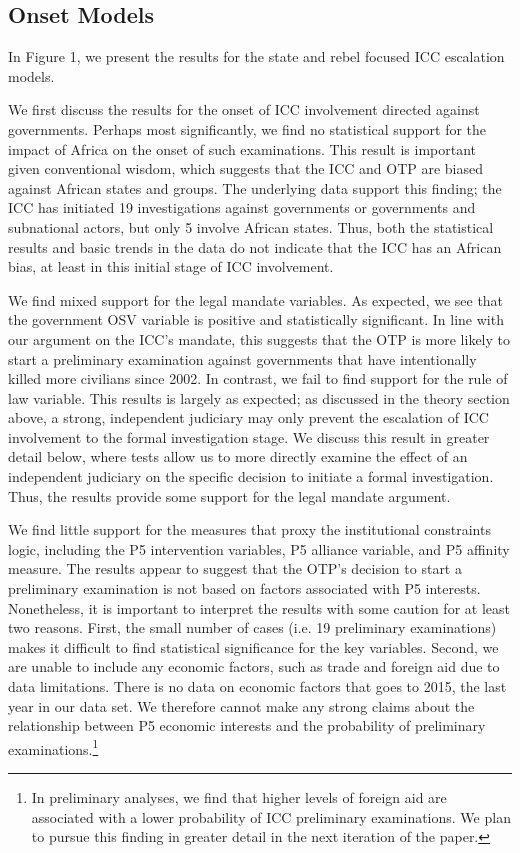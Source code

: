 
\subsection*{Onset Models}

In Figure 1, we present the results for the state and rebel focused ICC escalation models.  

We first discuss the results for the onset of ICC involvement directed against governments.  Perhaps most significantly, we find no statistical support for the impact of Africa on the onset of such examinations. This result is important given conventional wisdom, which suggests that the ICC and OTP are biased against African states and groups.  The underlying data support this finding; the ICC has initiated 19 investigations against governments or governments and subnational actors, but only 5 involve African states. Thus, both the statistical results and basic trends in the data do not indicate that the ICC has an African bias, at least in this initial stage of ICC involvement. 

We find mixed support for the legal mandate variables.  As expected, we see that the government OSV variable is positive and statistically significant. In line with our argument on the ICC’s mandate, this suggests that the OTP is more likely to start a preliminary examination against governments that have intentionally killed more civilians since 2002.  In contrast, we fail to find support for the rule of law variable. This results is largely as expected; as discussed in the theory section above, a strong, independent judiciary may only prevent the escalation of ICC involvement to the formal investigation stage. We discuss this result in greater detail below, where tests allow us to more directly examine the effect of an independent judiciary on the specific decision to initiate a formal investigation. Thus, the results provide some support for the legal mandate argument.

We find little support for the measures that proxy the institutional constraints logic, including the P5 intervention variables, P5 alliance variable, and P5 affinity measure. The results appear to suggest that the OTP’s decision to start a preliminary examination is not based on factors associated with P5 interests.  Nonetheless, it is important to interpret the results with some caution for at least two reasons. First, the small number of cases (i.e. 19 preliminary examinations) makes it difficult to find statistical significance for the key variables. Second, we are unable to include any economic factors, such as trade and foreign aid due to data limitations. There is no data on economic factors that goes to 2015, the last year in our data set. We therefore cannot make any strong claims about the relationship between P5 economic interests and the probability of preliminary examinations.\footnote{In preliminary analyses, we find that higher levels of foreign aid are associated with a lower probability of ICC preliminary examinations.  We plan to pursue this finding in greater detail in the next iteration of the paper.} 

